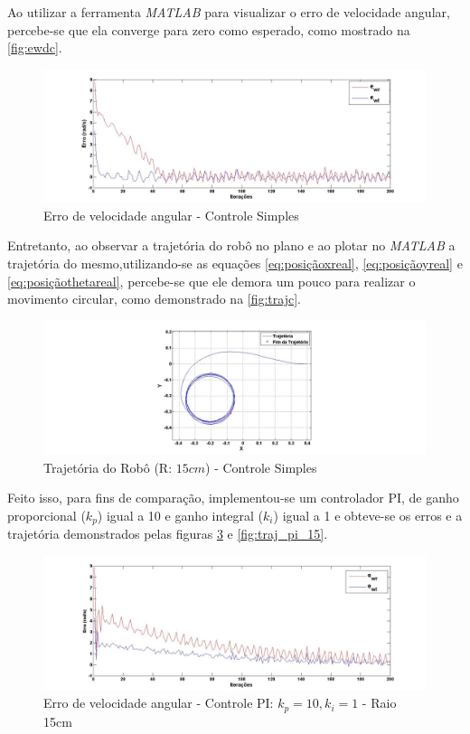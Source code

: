 Ao utilizar a ferramenta \emph{MATLAB\textregistered} para visualizar o erro de velocidade angular, percebe-se que ela converge para zero como esperado, como mostrado na \autoref{fig:ewdc}.

\begin{figure}[!htb]
	\centering
	\includegraphics[width=1.0\textwidth]{./04-figuras/Ewd_b1c}
	\caption{Erro de velocidade angular - Controle Simples}
	\label{fig:ewdc}
\end{figure}

Entretanto, ao observar a trajetória do robô no plano e ao plotar no \emph{MATLAB\textregistered} a trajetória do mesmo,utilizando-se as equações \ref*{eq:posiçãoxreal}, \ref*{eq:posiçãoyreal} e \ref*{eq:posiçãothetareal}, percebe-se que ele demora um pouco para realizar o movimento circular, como demonstrado na \autoref{fig:trajc}.

\begin{figure}[!htb]
	\centering
	\includegraphics[width=1.0\textwidth]{./04-figuras/trajetoria_b1_15c}
	\caption{Trajetória do Robô (R: $15cm$) - Controle Simples}
	\label{fig:trajc}
\end{figure}

Feito isso, para fins de comparação, implementou-se um controlador PI, de ganho proporcional ($k_{p}$) igual a 10 e ganho integral ($k_{i}$) igual a 1 e obteve-se os erros e a trajetória demonstrados pelas figuras \ref*{fig:ewd_pi_15} e \ref*{fig:traj_pi_15}. 

\begin{figure}[!htb]
	\centering
	\includegraphics[width=1.0\textwidth]{./04-figuras/Ewd_b1_pi_15}
	\caption{Erro de velocidade angular - Controle PI: $k_{p}=10,k_{i}=1$ - Raio 15cm}
	\label{fig:ewd_pi_15}
\end{figure}

